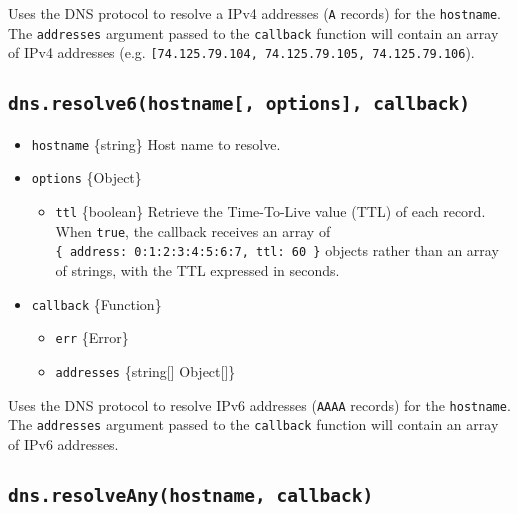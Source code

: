Uses the DNS protocol to resolve a IPv4 addresses (\texttt{A} records)
for the \texttt{hostname}. The \texttt{addresses} argument passed to the
\texttt{callback} function will contain an array of IPv4 addresses (e.g.
\texttt{{[}\textquotesingle{}74.125.79.104\textquotesingle{},\ \textquotesingle{}74.125.79.105\textquotesingle{},\ \textquotesingle{}74.125.79.106\textquotesingle{}{]}}).

\subsection{\texorpdfstring{\texttt{dns.resolve6(hostname{[},\ options{]},\ callback)}}{dns.resolve6(hostname{[}, options{]}, callback)}}\label{dns.resolve6hostname-options-callback}

\begin{itemize}
\tightlist
\item
  \texttt{hostname} \{string\} Host name to resolve.
\item
  \texttt{options} \{Object\}

  \begin{itemize}
  \tightlist
  \item
    \texttt{ttl} \{boolean\} Retrieve the Time-To-Live value (TTL) of
    each record. When \texttt{true}, the callback receives an array of
    \texttt{\{\ address:\ \textquotesingle{}0:1:2:3:4:5:6:7\textquotesingle{},\ ttl:\ 60\ \}}
    objects rather than an array of strings, with the TTL expressed in
    seconds.
  \end{itemize}
\item
  \texttt{callback} \{Function\}

  \begin{itemize}
  \tightlist
  \item
    \texttt{err} \{Error\}
  \item
    \texttt{addresses} \{string{[}{]} \textbar{} Object{[}{]}\}
  \end{itemize}
\end{itemize}

Uses the DNS protocol to resolve IPv6 addresses (\texttt{AAAA} records)
for the \texttt{hostname}. The \texttt{addresses} argument passed to the
\texttt{callback} function will contain an array of IPv6 addresses.

\subsection{\texorpdfstring{\texttt{dns.resolveAny(hostname,\ callback)}}{dns.resolveAny(hostname, callback)}}\label{dns.resolveanyhostname-callback}

